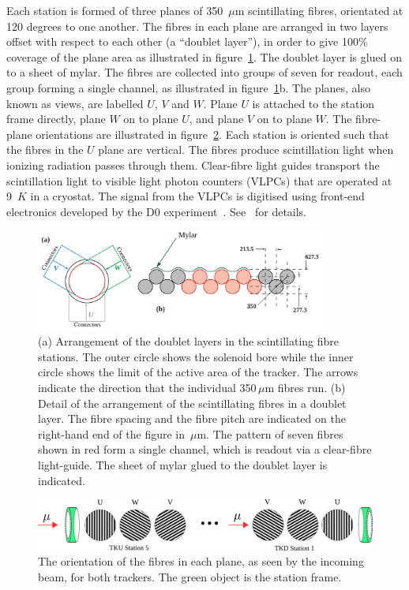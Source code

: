   Each station is formed of three planes of 350~$\mu$m scintillating fibres, orientated at 120 degrees to one another. The fibres in each plane are arranged in two layers offset with respect to each other (a ``doublet layer''), in order to give 100$\%$ coverage of the plane area as illustrated in figure~\ref{fig:DoubletLayer}. The doublet layer is glued on to a sheet of mylar. The fibres are collected into groups of seven for readout, each group forming a single channel, as illustrated in figure~\ref{fig:DoubletLayer}b. The planes, also known as views, are labelled $U$, $V$ and $W$. Plane $U$ is attached to the station frame directly, plane $W$ on to plane $U$, and plane $V$ on to plane $W$. The fibre-plane orientations are illustrated in figure~\ref{fig:FibrePlaneOrientation}. Each station is oriented such that the fibres in the $U$ plane are vertical. The fibres produce scintillation light when ionizing radiation passes through them. Clear-fibre light guides transport the scintillation light to visible light photon counters (VLPCs) that are operated at 9~$K$ in a cryostat. The signal from the VLPCs is digitised using front-end electronics developed by the D0 experiment~\cite{D0}. See~\cite{MiceTrackers} for details.

  \begin{figure}[tbh]
    \begin{center}
      \includegraphics[width=0.85\textwidth]{01-MICE/doublet-layer.pdf}
      \caption{\label{fig:DoubletLayer}(a) Arrangement of the doublet layers in the scintillating fibre  stations. The outer circle shows the solenoid bore while the inner circle shows the limit of the active area of the tracker. The arrows indicate the direction that the individual 350\,$\mu$m fibres run. (b) Detail of the arrangement of the scintillating fibres in a doublet layer. The fibre spacing and the fibre pitch are indicated on the right-hand end of the figure in \,$\mu$m. The pattern of seven fibres shown in red form a single channel, which is readout via a clear-fibre light-guide. The sheet of mylar glued to the doublet layer is indicated. }
    \end{center}
  \end{figure}

  \begin{figure}[tbh]
    \centering
    \includegraphics[width=0.95\linewidth]{01-MICE/FibrePlaneOrientation.pdf} \hspace{2pc}%
    \caption{\label{fig:FibrePlaneOrientation} The orientation of the fibres in each plane, as seen by the incoming beam, for both trackers. The green object is the station frame.}
  \end{figure}